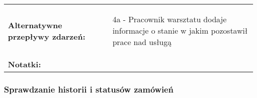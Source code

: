\documentclass[a4paper,20pt]{article}
\begin{document}
\begin{center}
\begin{tabularx}{\textwidth}[t]{XX}
\quad \textbf{Alternatywne przepływy zdarzeń:} & 
\begin{minipage}[t]{\linewidth}%
\begin{itemize}
\item [4a] - Pracownik warsztatu dodaje informacje o stanie w jakim pozostawił prace nad usługą
\end{itemize}
\end{minipage}\\


\quad \textbf{Notatki:} & 
\begin{minipage}[t]{\linewidth}%

\end{minipage}\\


\end{tabularx}
\end{center}




\subsubsection{Sprawdzanie historii i statusów zamówień}
\end{document}
